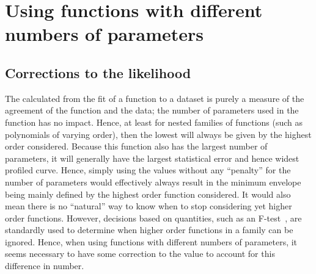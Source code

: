\section{Using functions with different numbers of parameters} %
\label{sec:correction}

\subsection{Corrections to the likelihood}
\label{sec:correction:corrections}

The \nll calculated from the fit of a function to a dataset is purely a measure
of the agreement of the function and the data; the number of parameters
used in the function has no impact. Hence, at least for nested families of
functions (such as polynomials of varying order), then the lowest \nll will
always be given by the highest order considered.
Because this function also has the
largest number of parameters, it will generally have the largest statistical
error and hence widest profiled \nll curve.
Hence, simply using the \nll values
without any ``penalty'' for the number of parameters would effectively
always result in the minimum envelope being mainly defined by the highest
order function considered. It would also mean there is no ``natural'' way to know when
to stop considering yet higher order functions. However, decisions based
on quantities, such as an F-test~\cite{ref:ftest},
are standardly used to determine when higher order functions in
a family can be ignored. Hence, when using functions with different
numbers of parameters, it seems necessary to have some correction to the \nll
value to account for this difference in number.

